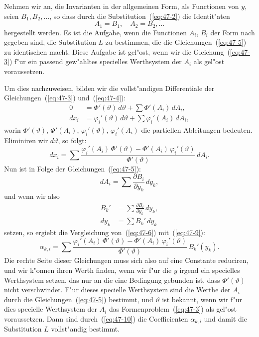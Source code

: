 \documentclass[12pt,a4paper]{article}
\theoremstyle{definition}
\begin{document}
Nehmen wir an, die Invarianten in der allgemeinen Form, als Functionen von $y$, seien $B_1, B_2, \ldots$, so dass durch die Substitution~(\ref{eq:47-2}) die Identit"aten
\begin{equation}\label{eq:47-5}
A_1 = B_1, \quad A_2 = B_2, \ldots
\end{equation}
hergestellt werden. Es ist die Aufgabe, wenn die Functionen $A_i$, $B_i$ der Form nach gegeben sind, die Substitution $L$ zu bestimmen, die die Gleichungen~(\ref{eq:47-5}) zu identischen macht. Diese Aufgabe ist gel"ost, wenn wir die Gleichung~(\ref{eq:47-3}) f"ur ein passend gew"ahltes specielles Werthsystem der $A_i$ als gel"ost voraussetzen.

Um dies nachzuweisen, bilden wir die vollst"andigen Differentiale der Gleichungen~(\ref{eq:47-3}) und~(\ref{eq:47-4}):
\begin{align*}
0 &= \Phi'(\vartheta)\, d\vartheta + \sum \Phi'(A_i)\, dA_i, \\
dx_i &= \varphi_i'(\vartheta)\, d\vartheta + \sum \varphi_i'(A_i)\, dA_i,
\end{align*}
worin $\Phi'(\vartheta)$, $\Phi'(A_i)$, $\varphi_i'(\vartheta)$, $\varphi_i'(A_i)$ die partiellen Ableitungen bedeuten. Eliminiren wir $d\vartheta$, so folgt:
\begin{equation}\label{eq:47-6}
dx_i = \sum \frac{\varphi_i'(A_i)\, \Phi'(\vartheta) - \Phi'(A_i)\, \varphi_i'(\vartheta)}{\Phi'(\vartheta)}\, dA_i.
\end{equation}
Nun ist in Folge der Gleichungen~(\ref{eq:47-5}):
\begin{equation}\label{eq:47-7}
dA_i = \sum \frac{\partial B_i}{\partial y_k}\, dy_k,
\end{equation}
und wenn wir also
\begin{align}
B_k' &= \sum \frac{\partial B_i}{\partial y_k}\, dy_k, \label{eq:47-8}\\
dy_k &= \sum B_k'\, dy_k \label{eq:47-9}
\end{align}
setzen, so ergiebt die Vergleichung von~(\ref{eq:47-6}) mit~(\ref{eq:47-9}):
\begin{equation}\label{eq:47-10}
\alpha_{k,i} = \sum \frac{\varphi_i'(A_i)\, \Phi'(\vartheta) - \Phi'(A_i)\, \varphi_i'(\vartheta)}{\Phi'(\vartheta)}\, B_k'(y_k).
\end{equation}
Die rechte Seite dieser Gleichungen muss sich also auf eine Constante reduciren, und wir k"onnen ihren Werth finden, wenn wir f"ur die $y$ irgend ein specielles Werthsystem setzen, das nur an die eine Bedingung gebunden ist, dass $\Phi'(\vartheta)$ nicht verschwindet. F"ur dieses specielle Werthsystem sind die Werthe der $A_i$ durch die Gleichungen~(\ref{eq:47-5}) bestimmt, und $\vartheta$ ist bekannt, wenn wir f"ur dies specielle Werthsystem der $A_i$ das Formenproblem~(\ref{eq:47-3}) als gel"ost voraussetzen. Dann sind durch~(\ref{eq:47-10}) die Coefficienten $\alpha_{k,i}$ und damit die Substitution $L$ vollst"andig bestimmt.
\end{document}
